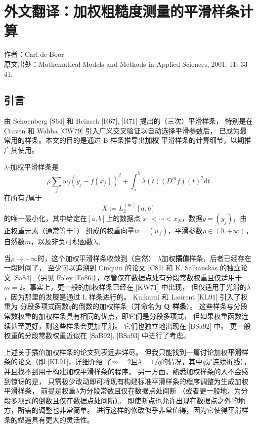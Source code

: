 \cleardoublepage

\newrefsection

\chapter{外文翻译：加权粗糙度测量的平滑样条计算}
\begin{center}
  作者：Carl de Boor\\
  原文出处：Mathematical Models and
  Methods in Applied Sciences, 2001, 11: 33-41.
\end{center}


\section{引言}
由 Schoenberg [S64] 和 Reinsch [R67], [R71] 提出的（三次）平滑样条，
特别是在 Craven 和 Wahba [CW79] 引入广义交叉验证以自动选择平滑参数后，
已成为最常用的样条。本文的目的是通过 B 样条推导出\textbf{加权}
平滑样条的计算细节，以期推广其使用。

$\lambda$-加权平滑样条是
\begin{equation}
  \label{eq:minimumFunctional}
  \rho\sum_{j} w_{j}\left( y_{j}-f(x_{j}) \right)^{2}
  +\int_{a}^{b}\lambda(t)(D^{m}f)(t)^{2}\mathrm{d}t
\end{equation}
在所有$f$属于
\begin{displaymath}
  X:=L_{2}^{(m)}[a, b]
\end{displaymath}
的唯一最小化，其中给定在$[a,b]$上的数据点
$x_{1}<\cdots <x_{N}$，数据$y=(y_{j})$，由正权重元素（通常等于1）
组成的权重向量$w=(w_{j})$，平滑参数$\rho\in(0,+\infty)$，
自然数$m$，以及非负可积函数$\lambda$。

当$\rho\to +\infty$时，这个加权平滑样条收敛到（自然）
$\lambda$加权\textbf{插值}样条，后者已经存在一段时间了，
至少可以追溯到 Cinquin 的论文 [C81] 和 K. Salkauskas 的独立论文 [Sa84]
（另见 Foley [Fo86]），尽管仅在数据点处有分段常数权重且仅适用于
$m=2$。事实上，更一般的加权样条已经在 [KW71] 中出现，
但仅适用于光滑的$\lambda$，因为那里的发展是通过 L 样条进行的。
Kulkarni 和 Laurent [KL91] 引入了权重为
分段多项式函数$q$的倒数的加权样条（并命名为\textbf{ Q 样条}）。
这些样条与分段常数权重的加权样条具有相同的优点，即它们是分段多项式，
但如果权重函数连续甚至更好，则这些样条会更加平滑。
它们也独立地出现在 [BSa92] 中。
更一般权重的分段常数权重近似在 [SaB92], [BSa93] 中进行了考虑。

上述关于插值加权样条的论文列表远非详尽。
但我只能找到一篇讨论加权\textbf{平滑}样条的论文（即 [KL91]，详细介绍
了$m=2$且$\lambda=1/q$的情况，其中$q$是连续折线），
并且找不到用于构建加权平滑样条的程序。
另一方面，熟悉加权样条的人不会感到惊讶的是，
只需极少改动即可将现有构建标准平滑样条的程序调整为生成加权平滑样条，
前提是权重$\lambda$为分段常数且仅在数据点处间断
（或者更一般地，为分段多项式的倒数且仅在数据点处间断）。
即使断点也允许出现在数据点之外的地方，所需的调整也非常简单。
进行这样的修改似乎非常值得，因为它使得平滑样条的塑造具有更大的灵活性。
